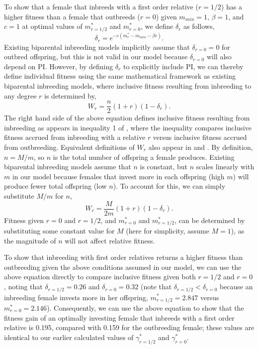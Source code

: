 \documentclass[12pt]{article}
\begin{document}
To show that a female that inbreeds with a first order relative ($r=1/2$) has a higher fitness than a female that outbreeds ($r=0$) given $m_{min}=1$, $\beta=1$, and $c=1$ at optimal values of $m^{*}_{r=1/2}$ and $m^{*}_{r=0}$, we define $\delta_{r}$ as follows,
\begin{equation}
\delta_{r} = e^{-c(m^{*}_{r}-m_{min}-\beta r)}.
\end{equation}
Existing biparental inbreeding models \cite[e.g.,][]{Kokko2006, Parker2006, Duthie2015a} implicitly assume that $\delta_{r=0}=0$ for outbred offspring, but this is not valid in our model because $\delta_{r=0}$ will also depend on PI. However, by defining $\delta_{r}$ to explicitly include PI, we can thereby define individual fitness using the same mathematical framework as existing biparental inbreeding models, where inclusive fitness resulting from inbreeding to any degree $r$ is determined by,
\begin{equation}
W_{r} = \frac{n}{2}\left(1+r\right)\left(1-\delta_{r}\right).
\end{equation}
The right hand side of the above equation defines inclusive fitness resulting from inbreeding as appears in inequality 1 of \cite{Duthie2015a}, where the inequality compares inclusive fitness accrued from inbreeding with a relative $r$ versus inclusive fitness accrued from outbreeding. Equivalent definitions of $W_{r}$ also appear in \cite{Parker2006} and \cite{Kokko2006}. By definition, $n = M/m$, so $n$ is the total number of offspring a female produces. Existing biparental inbreeding models assume that $n$ is constant, but $n$ scales linearly with $m$ in our model because females that invest more in each offspring (high $m$) will produce fewer total offspring (low $n$). To account for this, we can simply substitute $M/m$ for $n$,
\begin{equation}
W_{r} = \frac{M}{2 m}\left(1+r\right)\left(1-\delta_{r}\right).
\end{equation}
Fitness given $r=0$ and $r=1/2$, and $m^{*}_{r=0}$ and $m^{*}_{r=1/2}$, can be determined by substituting some constant value for $M$ (here for simplicity, assume $M=1$), as the magnitude of $n$ will not affect relative fitness. 

To show that inbreeding with first order relatives returns a higher fitness than outbreeding given the above conditions assumed in our model, we can use the above equation directly to compare inclusive fitness given both $r=1/2$ and $r=0$, noting that $\delta_{r=1/2}=0.26$ and $\delta_{r=0}=0.32$ (note that $\delta_{r=1/2}<\delta_{r=0}$ because an inbreeding female invests more in her offspring, $m^{*}_{r=1/2}=2.847$ versus $m^{*}_{r=0}=2.146$). Consequently, we can use the above equation to show that the fitness gain of an optimally investing female that inbreeds with a first order relative is 0.195, compared with 0.159 for the outbreeding female; these values are identical to our earlier calculated values of $\gamma^{*}_{r=1/2}$ and $\gamma^{*}_{r=0}$.
\end{document}
